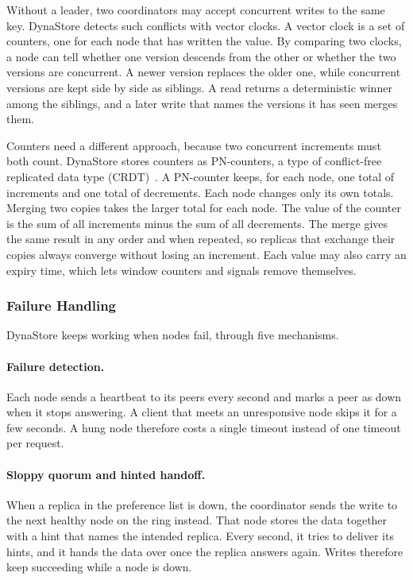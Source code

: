 \documentclass[11pt,a4paper]{article}
\begin{document}
Without a leader, two coordinators may accept concurrent writes to the same key. DynaStore detects such conflicts with vector clocks. A vector clock is a set of counters, one for each node that has written the value. By comparing two clocks, a node can tell whether one version descends from the other or whether the two versions are concurrent. A newer version replaces the older one, while concurrent versions are kept side by side as siblings. A read returns a deterministic winner among the siblings, and a later write that names the versions it has seen merges them.

Counters need a different approach, because two concurrent increments must both count. DynaStore stores counters as PN-counters, a type of conflict-free replicated data type (CRDT)~\cite{crdt}. A PN-counter keeps, for each node, one total of increments and one total of decrements. Each node changes only its own totals. Merging two copies takes the larger total for each node. The value of the counter is the sum of all increments minus the sum of all decrements. The merge gives the same result in any order and when repeated, so replicas that exchange their copies always converge without losing an increment. Each value may also carry an expiry time, which lets window counters and signals remove themselves.

\subsubsection{Failure Handling}

DynaStore keeps working when nodes fail, through five mechanisms.

\paragraph{Failure detection.} Each node sends a heartbeat to its peers every second and marks a peer as down when it stops answering. A client that meets an unresponsive node skips it for a few seconds. A hung node therefore costs a single timeout instead of one timeout per request.

\paragraph{Sloppy quorum and hinted handoff.} When a replica in the preference list is down, the coordinator sends the write to the next healthy node on the ring instead. That node stores the data together with a hint that names the intended replica. Every second, it tries to deliver its hints, and it hands the data over once the replica answers again. Writes therefore keep succeeding while a node is down.
\end{document}
